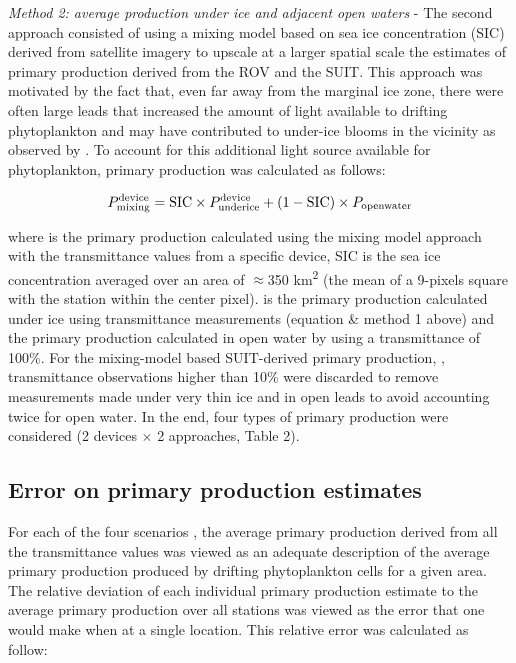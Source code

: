 \textit{Method 2: average production under ice and adjacent open waters} - The second approach consisted of using a mixing model based on sea ice concentration (SIC) derived from satellite imagery to upscale at a larger spatial scale the estimates of primary production derived from the ROV and the SUIT. This approach was motivated by the fact that, even far away from the marginal ice zone, there were often large leads that increased the amount of light available to drifting phytoplankton and may have contributed to under-ice blooms in the vicinity as observed by \citet{Assmy2017}. To account for this additional light source available for phytoplankton, primary production was calculated as follows:

\begin{linenomath*}
    \begin{equation}
		\ppmixingdevice{} = \text{SIC} \times \ppundericedevice{} + (1 - \text{SIC}) \times \ppopenwater{}
	\end{equation}
\end{linenomath*}

where \ppmixingdevice{} is the primary production calculated using the mixing model approach with the transmittance values from a specific device, SIC is the sea ice concentration averaged over an area of $\approx$350 km\textsuperscript{2} (the mean of a 9-pixels square with the station within the center pixel). \ppundericedevice{} is the primary production calculated under ice using transmittance measurements (equation \DIFdelbegin {}\DIFdelend \DIFaddbegin {}\DIFaddend \& method 1 above) and \ppopenwater{} the primary production calculated in open water by using a transmittance of 100\%. For the mixing-model based SUIT-derived primary production, \ppmixingsuit{}, transmittance observations higher than 10\% were discarded to remove measurements made under very thin ice and in open leads to avoid accounting twice for open water. In the end, four types of primary production were considered (2 devices $\times$ 2 approaches, Table 2).

\subsection{Error on primary production estimates}

For each of the four scenarios \DIFaddbegin \DIFadd{(}\ppmixingsuit{}\DIFadd{, }\ppmixingrov{}\DIFadd{, }\ppsuitunderice{}\DIFadd{, }\pprovunderice{}\DIFadd{)}\DIFaddend , the average primary production derived from all the transmittance values was viewed as an adequate description of the average primary production produced by drifting phytoplankton cells for a given area. The relative deviation of each individual primary production estimate to the average primary production over all stations was viewed as the error that one would make when \DIFdelbegin {}\DIFdelend \DIFaddbegin {}\DIFaddend at a single \DIFdelbegin {}\DIFdelend location. This relative error was calculated as follow:

